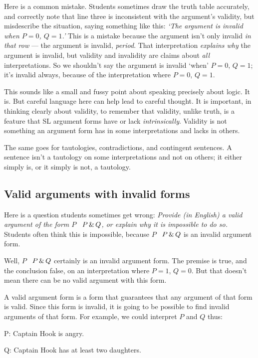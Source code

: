Here is a common mistake. Students sometimes draw the truth table accurately, and correctly note that line three is inconsistent with the argument's validity, but misdescribe the situation, saying something like this: \emph{`The argument is invalid when $P=0$, $Q=1$.'} This is a mistake because the argument isn't only invalid \emph{in that row} --- the argument is invalid, \emph{period}. That interpretation \emph{explains why} the argument is invalid, but validity and invalidity are claims about \emph{all} interpretations. So we shouldn't say the argument is invalid `when' $P=0$, $Q=1$; it's invalid always, because of the interpretation where $P=0$, $Q=1$.

This sounds like a small and fussy point about speaking precisely about logic. It is. But careful language here can help lead to careful thought. It is important, in thinking clearly about validity, to remember that validity, unlike truth, is a feature that SL argument forms have or lack \emph{intrinsically}. Validity is not something an argument form has in some interpretations and lacks in others.

The same goes for tautologies, contradictions, and contingent sentences. A sentence isn't a tautology on some interpretations and not on others; it either simply is, or it simply is not, a tautology.

\subsection{Valid arguments with invalid forms}

Here is a question students sometimes get wrong: \emph{Provide (in English) a valid argument of the form $P$ \therefore\ $P \,\&\, Q$, or explain why it is impossible to do so.} Students often think this is impossible, because $P$ \therefore\ $P \,\&\, Q$ is an invalid argument form.

Well,  $P$ \therefore\ $P \,\&\, Q$ certainly is an invalid argument form. The premise is true, and the conclusion false, on an interpretation where $P=1$, $Q=0$. But that doesn't mean there can be no valid argument with this form.

A valid argument form is a form that guarantees that any argument of that form is valid. Since this form is invalid, it is going to be possible to find invalid arguments of that form. For example, we could interpret $P$ and $Q$ thus:

\begin{ekey}
\item[P:] Captain Hook is angry.
\item[Q:] Captain Hook has at least two daughters.
\end{ekey}

